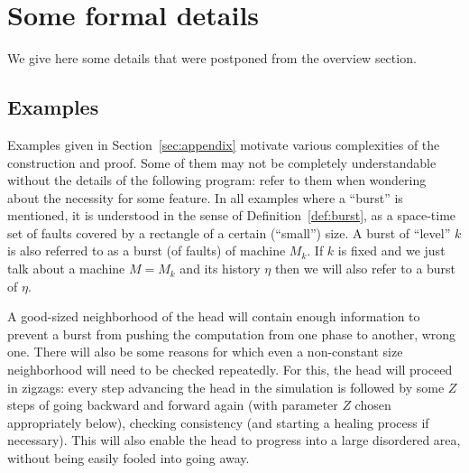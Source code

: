 \documentclass[11pt]{memoir}
\theoremstyle{definition} %
\newcommand{\Z}{Z} %
\begin{document}


\section{Some formal details}

We give here some details that were postponed from the overview section.

\subsection{Examples}\label{sec:examples}

Examples given in Section~\ref{sec:appendix}
motivate various complexities of the construction and proof.
Some of them may not be completely understandable without the details of the following program:
refer to them when wondering about the necessity for some feature.
In all examples where a ``burst'' is mentioned, it is understood in the sense of
Definition~\ref{def:burst}, as a space-time set of faults covered by a rectangle of a
certain (``small'') size.
A burst of ``level'' \( k \) is also referred to as a burst (of faults) of machine \( M_{k} \).
If \( k \) is fixed and we just talk about a machine \( M = M_{k} \) and its
history \( \eta \) then we will also refer to a burst of \( \eta \).


A good-sized neighborhood of the head will contain enough information
to prevent a burst from pushing the computation from one phase to another, wrong one.
There will also be some reasons for which even a non-constant size neighborhood will need
to be checked repeatedly.
For this, the head will proceed in zigzags: every
step advancing the head in the simulation is followed by some \( \Z \) steps 
of going backward and forward again (with parameter \( \Z \) chosen appropriately below),
checking consistency (and starting a healing process if necessary).
This will also enable the head to progress into a large
disordered area, without being easily fooled into going away.
\end{document}
